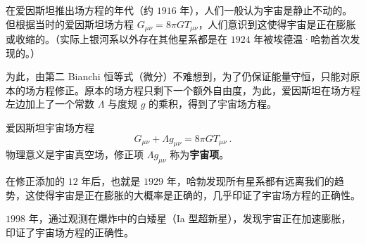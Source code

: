 

在爱因斯坦推出场方程的年代（约 $1916$ 年），人们一般认为宇宙是静止不动的。但根据当时的爱因斯坦场方程 $ G_{\mu \nu} = 8 \pi G  T_{\mu \nu}$，人们意识到这使得宇宙是正在膨胀或收缩的。（实际上银河系以外存在其他星系都是在 $1924$ 年被埃德温·哈勃首次发现的。）

为此，由第二 Bianchi 恒等式（微分）不难想到，为了仍保证能量守恒，只能对原本的场方程修正。原本的场方程只剩下一个额外自由度，为此，爱因斯坦在场方程左边加上了一个常数 $\Lambda$ 与度规 $g$ 的乘积，得到了宇宙场方程。

\begin{theorem}{爱因斯坦宇宙场方程}
$$G_{\mu \nu} + \Lambda g_{\mu \nu} = 8\pi G T_{\mu \nu} ~.$$
物理意义是宇宙真空场，修正项 $\Lambda g_{\mu \nu}$ 称为\textbf{宇宙项}。
\end{theorem}

在修正添加的 $12$ 年后，也就是 $1929$ 年，哈勃发现所有星系都有远离我们的趋势，这使得宇宙是正在膨胀的大概率是正确的，几乎印证了宇宙场方程的正确性。

$1998$ 年，通过观测在爆炸中的白矮星（Ia 型超新星），发现宇宙正在加速膨胀，印证了宇宙场方程的正确性。